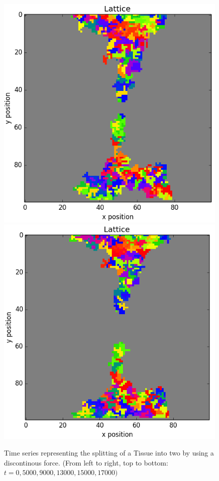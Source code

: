 \documentclass[12pt]{article}
\begin{document}
\begin{figure}[h]
	\includegraphics[scale=0.52]{img/nebula_15000}
	\includegraphics[scale=0.52]{img/nebula_17000}
	\caption{Time series representing the splitting of a Tissue into two by using a discontinous force. (From left to right, top to bottom: $t=0,5000,9000, 13000, 15000,17000)$}
	\label{nebula}
\end{figure}

\newpage


\end{document}
